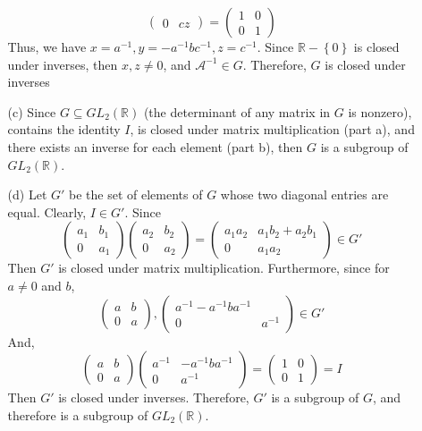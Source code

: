 \documentclass[12pt]{article}
\begin{document}
\begin{itemize}
\begin{itemize}
$$\begin{pmatrix}
0 & cz
\end{pmatrix} = \begin{pmatrix}
1 & 0 \\
0 & 1
\end{pmatrix}$$
Thus, we have $x = a^{-1}, y = -a^{-1}bc^{-1}, z = c^{-1}$. Since $\mathbb{R} - \left\lbrace 0 \right\rbrace$ is closed under inverses, then $x, z \neq 0$, and $\mathcal{A}^{-1} \in G$. Therefore, $G$ is closed under inverses
\item[(c)]
Since $G \subseteq GL_2(\mathbb{R})$ (the determinant of any matrix in $G$ is nonzero), contains the identity $I$, is closed under matrix multiplication (part a), and there exists an inverse for each element (part b), then $G$ is a subgroup of $GL_2(\mathbb{R})$.
\item[(d)]
Let $G'$ be the set of elements of $G$ whose two diagonal entries are equal. Clearly, $I \in G'$. Since
$$\begin{pmatrix}
a_1 & b_1 \\
0 & a_1
\end{pmatrix}\begin{pmatrix}
a_2 & b_2 \\
0 & a_2
\end{pmatrix} = \begin{pmatrix}
a_1a_2 & a_1b_2 + a_2b_1 \\
0 & a_1a_2
\end{pmatrix} \in G'$$
Then $G'$ is closed under matrix multiplication. Furthermore, since for $a \neq 0$ and $b$,
$$\begin{pmatrix}
a & b \\
0 & a
\end{pmatrix}, \begin{pmatrix}
a^{-1} -a^{-1}ba^{-1} \\
0 & a^{-1}
\end{pmatrix} \in G'$$
And,
$$\begin{pmatrix}
a & b \\
0 & a
\end{pmatrix}\begin{pmatrix}
a^{-1} & -a^{-1}ba^{-1} \\
0 & a^{-1}
\end{pmatrix} = \begin{pmatrix}
1 & 0 \\
0 & 1
\end{pmatrix} = I$$
Then $G'$ is closed under inverses. Therefore, $G'$ is a subgroup of $G$, and therefore is a subgroup of $GL_2(\mathbb{R})$.
\end{itemize}

\end{itemize}
\end{document}
